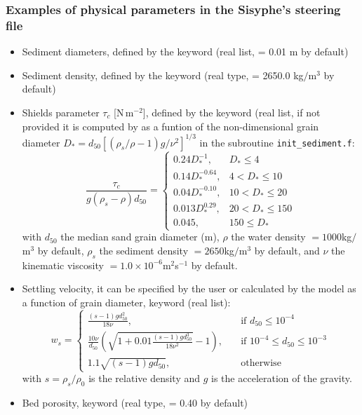 {\subsubsection{Examples of physical parameters in the Sisyphe's steering file}
\begin{itemize}
\item Sediment diameters, defined by the keyword  (real list, {\ttfamily = 0.01} m by default)
\item Sediment density, defined by the keyword  (real type, {\ttfamily = 2650.0} kg$/$m$^3$ by default)
\item Shields parameter $\tau_c$ [N\,m$^{-2}$], defined by the keyword  (real list, if not provided it is computed by \sisyphe{} as a funtion of the non-dimensional grain diameter $D_*=d_{50}[(\rho_s/\rho-1)g/\nu^2]^{1/3}$ in the subroutine \texttt{init\_sediment.f}:
\begin{equation*}
\frac{\tau_c}{g(\rho_s -\rho)d_{50}}=\left\{\begin{array}{ll}
0.24 D_*^{-1}, & D_* \leq 4 \\
0.14 D_*^{-0.64}, & 4 < D_* \leq 10 \\
 0.04 D_*^{-0.10}, & 10 < D_* \leq 20\\
0.013 D_*^{0.29}, & 20 < D_* \leq 150 \\
0.045, & 150 \leq D_* 
\end{array}
\right.
\end{equation*}
with $d_{50}$ the median sand grain diameter (m), $\rho$ the water density $=1000$kg$/$m$^3$ by default, $\rho_s$ the sediment density $=2650$kg$/$m$^3$ by default, and $\nu$ the kinematic viscosity $=1.0\times 10^{-6}$m$^2$s$^{-1}$ by default.  
  
\item Settling velocity, it can be specified by the user or calculated by the model as a function of grain diameter, keyword  (real list):
  \begin{equation*}
w_{s} = \left\{\begin{array}{ll}
\displaystyle
\frac{(s-1)g d_{50}^2}{18\nu}, & \quad \text{if } d_{50} \leq 10^{-4} \\
\displaystyle
\frac{10\nu}{d_{50}} \left(\sqrt{1+0.01\frac{(s-1)gd_{50}^3}{18\nu^2}}-1\right), & \quad \text{if } 10^{-4} \leq d_{50} \leq 10^{-3}\\ 
\displaystyle
1.1 \sqrt{(s-1)gd_{50}}, & \quad \text{otherwise} 
\end{array}
\right.
\end{equation*}
with $s=\rho_{s}/\rho_0$ is the relative density and $g$ is the acceleration of the gravity.%
\item Bed porosity, keyword  (real type, {\ttfamily = 0.40} by default)  
\end{itemize}



}
